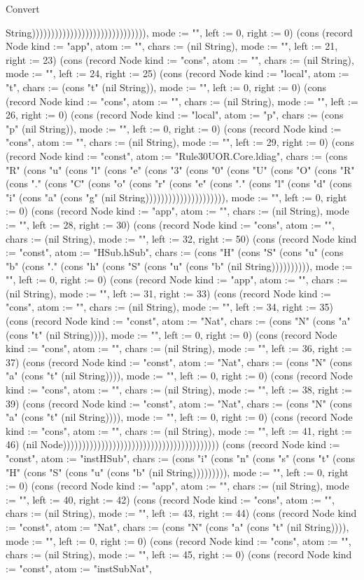 \begin{lexlean}{Convert}
\begin{semanticmodule}
{String)))))))))))))))))))))))))))))), mode := "", left := 0, right := 0}) (cons (record Node {kind := "app", atom := "", chars := (nil String), mode := "", left := 21, right := 23}) (cons (record Node {kind := "cons", atom := "", chars := (nil String), mode := "", left := 24, right := 25}) (cons (record Node {kind := "local", atom := "t", chars := (cons "t" (nil String)), mode := "", left := 0, right := 0}) (cons (record Node {kind := "cons", atom := "", chars := (nil String), mode := "", left := 26, right := 0}) (cons (record Node {kind := "local", atom := "p", chars := (cons "p" (nil String)), mode := "", left := 0, right := 0}) (cons (record Node {kind := "cons", atom := "", chars := (nil String), mode := "", left := 29, right := 0}) (cons (record Node {kind := "const", atom := "Rule30UOR.Core.ldiag", chars := (cons "R" (cons "u" (cons "l" (cons "e" (cons "3" (cons "0" (cons "U" (cons "O" (cons "R" (cons "." (cons "C" (cons "o" (cons "r" (cons "e" (cons "." (cons "l" (cons "d" (cons "i" (cons "a" (cons "g" (nil String))))))))))))))))))))), mode := "", left := 0, right := 0}) (cons (record Node {kind := "app", atom := "", chars := (nil String), mode := "", left := 28, right := 30}) (cons (record Node {kind := "cons", atom := "", chars := (nil String), mode := "", left := 32, right := 50}) (cons (record Node {kind := "const", atom := "HSub.hSub", chars := (cons "H" (cons "S" (cons "u" (cons "b" (cons "." (cons "h" (cons "S" (cons "u" (cons "b" (nil String)))))))))), mode := "", left := 0, right := 0}) (cons (record Node {kind := "app", atom := "", chars := (nil String), mode := "", left := 31, right := 33}) (cons (record Node {kind := "cons", atom := "", chars := (nil String), mode := "", left := 34, right := 35}) (cons (record Node {kind := "const", atom := "Nat", chars := (cons "N" (cons "a" (cons "t" (nil String)))), mode := "", left := 0, right := 0}) (cons (record Node {kind := "cons", atom := "", chars := (nil String), mode := "", left := 36, right := 37}) (cons (record Node {kind := "const", atom := "Nat", chars := (cons "N" (cons "a" (cons "t" (nil String)))), mode := "", left := 0, right := 0}) (cons (record Node {kind := "cons", atom := "", chars := (nil String), mode := "", left := 38, right := 39}) (cons (record Node {kind := "const", atom := "Nat", chars := (cons "N" (cons "a" (cons "t" (nil String)))), mode := "", left := 0, right := 0}) (cons (record Node {kind := "cons", atom := "", chars := (nil String), mode := "", left := 41, right := 46}) (nil Node))))))))))))))))))))))))))))))))))))))))) (cons (record Node {kind := "const", atom := "instHSub", chars := (cons "i" (cons "n" (cons "s" (cons "t" (cons "H" (cons "S" (cons "u" (cons "b" (nil String))))))))), mode := "", left := 0, right := 0}) (cons (record Node {kind := "app", atom := "", chars := (nil String), mode := "", left := 40, right := 42}) (cons (record Node {kind := "cons", atom := "", chars := (nil String), mode := "", left := 43, right := 44}) (cons (record Node {kind := "const", atom := "Nat", chars := (cons "N" (cons "a" (cons "t" (nil String)))), mode := "", left := 0, right := 0}) (cons (record Node {kind := "cons", atom := "", chars := (nil String), mode := "", left := 45, right := 0}) (cons (record Node {kind := "const", atom := "instSubNat", }
\end{semanticmodule}
\end{lexlean}

